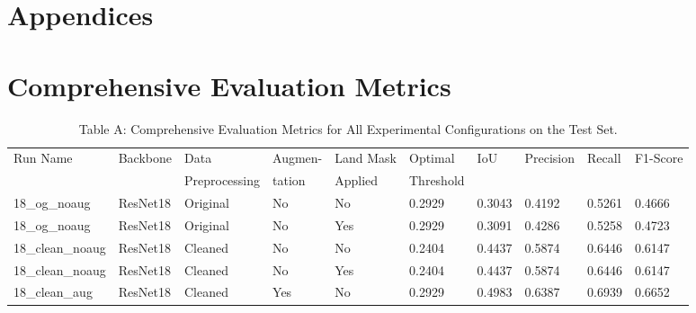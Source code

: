 \documentclass{article}
\begin{document}
\newpage

\appendix %

\section*{Appendices} %

\section{Comprehensive Evaluation Metrics} %
\label{appendix:all_metrics}

\begin{table}[htbp] %
  \centering
  \caption*{Table A: Comprehensive Evaluation Metrics for All Experimental Configurations on the Test Set.} %
  \vspace{0.5em}
  \begin{adjustbox}{width=\textwidth} %
  \label{table:appendix_all_results} %
  \small %
  \begin{tabular}{llllllllll}
    \toprule
    Run Name & Backbone & Data          & Augmen- & Land Mask & Optimal   & IoU    & Precision & Recall & F1-Score \\
             &          & Preprocessing & tation  & Applied   & Threshold &        &           &        &          \\
    \midrule
    18\_og\_noaug    & ResNet18 & Original & No  & No  & 0.2929 & 0.3043 & 0.4192 & 0.5261 & 0.4666 \\
    18\_og\_noaug    & ResNet18 & Original & No  & Yes & 0.2929 & 0.3091 & 0.4286 & 0.5258 & 0.4723 \\
    18\_clean\_noaug & ResNet18 & Cleaned  & No  & No  & 0.2404 & 0.4437 & 0.5874 & 0.6446 & 0.6147 \\
    18\_clean\_noaug & ResNet18 & Cleaned  & No  & Yes & 0.2404 & 0.4437 & 0.5874 & 0.6446 & 0.6147 \\
    18\_clean\_aug   & ResNet18 & Cleaned  & Yes & No  & 0.2929 & 0.4983 & 0.6387 & 0.6939 & 0.6652 \\

\end{tabular}
\end{adjustbox}
\end{table}
\end{document}
